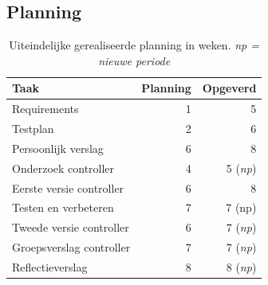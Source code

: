\documentclass{article}
\begin{document}
\subsection{Planning}
\label{uiteind-plan}
\begin{table}[h!]
\begin{tabular}{lrr}
 \textbf{Taak} & \textbf{Planning} & \textbf{Opgeverd} \\ \hline
 Requirements & 1 & 5 \\
 Testplan & 2 & 6 \\
 Persoonlijk verslag & 6 & 8 \\
 Onderzoek controller & 4 & 5 (\textit{np}) \\
 Eerste versie controller & 6 & 8 \\
 Testen en verbeteren & 7 & 7 (np) \\
 Tweede versie controller & 6 & 7 (\textit{np}) \\
 Groepsverslag controller & 7 & 7 (\textit{np}) \\
 Reflectieverslag & 8 & 8 (\textit{np})  \\
\end{tabular}
\caption{Uiteindelijke gerealiseerde planning in weken. \textit{np = nieuwe periode}}
\end{table}
\newpage


%

\end{document}
